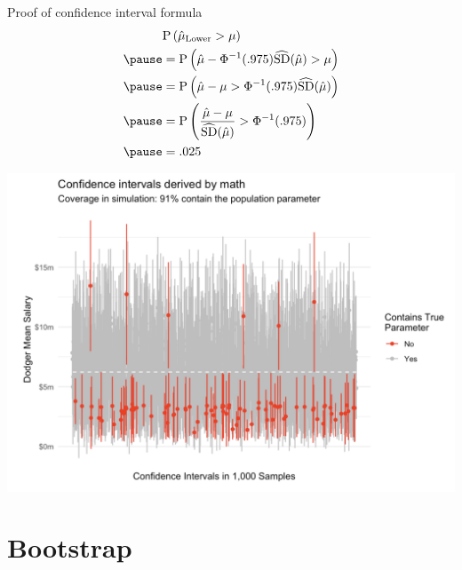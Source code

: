 \documentclass{beamer}
\begin{document}
\begin{frame}{Proof of confidence interval formula}
$$
\begin{aligned}
&\text{P}\left(\hat\mu_\text{Lower} > \mu\right)\\ \pause
&=\text{P}\left(\hat\mu - \Phi^{-1}(.975)\widehat{\text{SD}}(\hat\mu) > \mu\right)\\ \pause
&= \text{P}\left(\hat\mu - \mu > \Phi^{-1}(.975)\widehat{\text{SD}}(\hat\mu)\right)\\ \pause
&= \text{P}\left(\frac{\hat\mu - \mu}{\widehat{\text{SD}}(\hat\mu)} > \Phi^{-1}(.975)\right)\\ \pause
&= .025
\end{aligned}
$$

\end{frame}

\begin{frame}

\includegraphics[width = \textwidth]{figures/analytic_cis}
\end{frame}


\section{Bootstrap}
\end{document}
